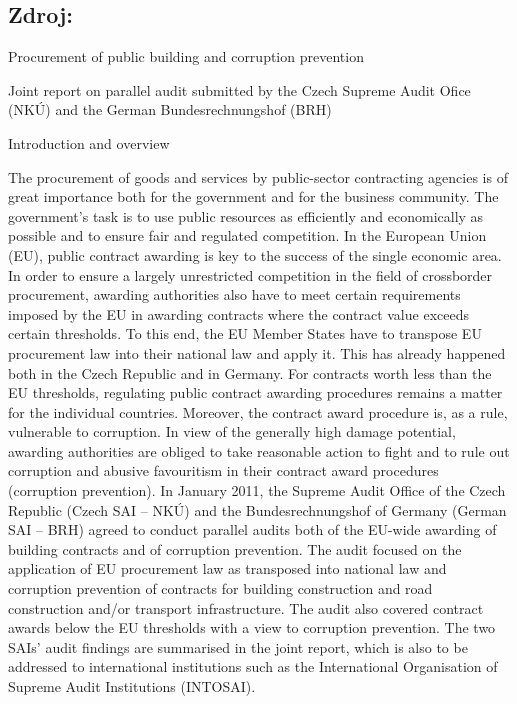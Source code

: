 \documentclass[10pt]{article}
\begin{document}
\subsection*{Zdroj:}



Procurement of public building and corruption prevention



Joint report on parallel audit submitted by the Czech Supreme Audit Ofice (NKÚ) and the German Bundesrechnungshof (BRH)



Introduction and overview

The procurement of goods and services by public-sector contracting agencies is of great importance both for the government and for the business community.
The government’s task is to use public resources as efficiently and economically as possible and to ensure fair and regulated competition.
In the European Union (EU), public contract awarding is key to the success of the single economic area.
In order to ensure a largely unrestricted competition in the field of crossborder procurement, awarding authorities also have to meet certain requirements imposed by the EU in awarding contracts where the contract value exceeds certain thresholds.
To this end, the EU Member States have to transpose EU procurement law into their national law and apply it.
This has already happened both in the Czech Republic and in Germany.
For contracts worth less than the EU thresholds, regulating public contract awarding procedures remains a matter for the individual countries.
Moreover, the contract award procedure is, as a rule, vulnerable to corruption.
In view of the generally high damage potential, awarding authorities are obliged to take reasonable action to fight and to rule out corruption and abusive favouritism in their contract award procedures (corruption prevention).
In January 2011, the Supreme Audit Office of the Czech Republic (Czech SAI – NKÚ) and the Bundesrechnungshof of Germany (German SAI – BRH) agreed to conduct parallel audits both of the EU-wide awarding of building contracts and of corruption prevention.
The audit focused on the application of EU procurement law as transposed into national law and corruption prevention of contracts for building construction and road construction and/or transport infrastructure.
The audit also covered contract awards below the EU thresholds with a view to corruption prevention.
The two SAIs’ audit findings are summarised in the joint report, which is also to be addressed to international institutions such as the International Organisation of Supreme Audit Institutions (INTOSAI).
\end{document}
